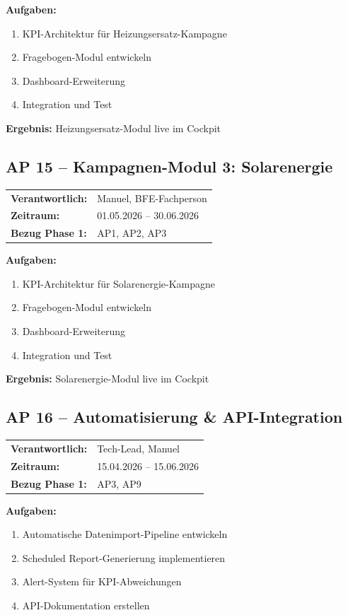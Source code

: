 \documentclass[11pt,a4paper]{article}
\begin{document}
\textbf{Aufgaben:}
\begin{enumerate}[label=AP14.\arabic*]
    \item KPI-Architektur für Heizungsersatz-Kampagne
    \item Fragebogen-Modul entwickeln
    \item Dashboard-Erweiterung
    \item Integration und Test
\end{enumerate}

\textbf{Ergebnis:} Heizungsersatz-Modul live im Cockpit

\subsection{AP 15 -- Kampagnen-Modul 3: Solarenergie}

\begin{tabular}{ll}
\textbf{Verantwortlich:} & Manuel, BFE-Fachperson\\
\textbf{Zeitraum:} & 01.05.2026 -- 30.06.2026\\
\textbf{Bezug Phase 1:} & AP1, AP2, AP3\\
\end{tabular}

\textbf{Aufgaben:}
\begin{enumerate}[label=AP15.\arabic*]
    \item KPI-Architektur für Solarenergie-Kampagne
    \item Fragebogen-Modul entwickeln
    \item Dashboard-Erweiterung
    \item Integration und Test
\end{enumerate}

\textbf{Ergebnis:} Solarenergie-Modul live im Cockpit

\subsection{AP 16 -- Automatisierung \& API-Integration}

\begin{tabular}{ll}
\textbf{Verantwortlich:} & Tech-Lead, Manuel\\
\textbf{Zeitraum:} & 15.04.2026 -- 15.06.2026\\
\textbf{Bezug Phase 1:} & AP3, AP9\\
\end{tabular}

\textbf{Aufgaben:}
\begin{enumerate}[label=AP16.\arabic*]
    \item Automatische Datenimport-Pipeline entwickeln
    \item Scheduled Report-Generierung implementieren
    \item Alert-System für KPI-Abweichungen
    \item API-Dokumentation erstellen
\end{enumerate}
\end{document}
